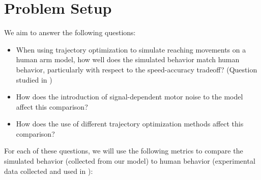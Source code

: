 \documentclass[letterpaper, 10pt, conference]{ieeeconf}
\begin{document}
\section{Problem Setup}
We aim to answer the following questions: 
\begin{itemize}
    \item When using trajectory optimization to simulate reaching movements on a human arm model, how well does the simulated behavior match human behavior, particularly with respect to the speed-accuracy tradeoff? (Question studied in \cite{c5})

    \item How does the introduction of signal-dependent motor noise to the model affect this comparison?

    \item How does the use of different trajectory optimization methods affect this comparison?
\end{itemize}
For each of these questions, we will use the following metrics to compare the simulated behavior (collected from our model) to human behavior (experimental data collected and used in \cite{c5}):
\end{document}
